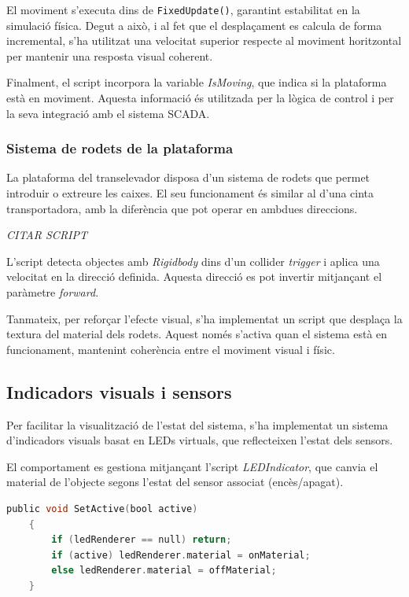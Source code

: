 \documentclass[12pt,a4paper]{report}
\begin{document}
El moviment s'executa dins de \texttt{FixedUpdate()}, garantint estabilitat en la simulació física. Degut a això, i al fet que el desplaçament es calcula de forma incremental, s'ha utilitzat una velocitat superior respecte al moviment horitzontal per mantenir una resposta visual coherent.

Finalment, el script incorpora la variable \textit{IsMoving}, que indica si la plataforma està en moviment. Aquesta informació és utilitzada per la lògica de control i per la seva integració amb el sistema SCADA.
\subsubsection{Sistema de rodets de la plataforma}

La plataforma del transelevador disposa d'un sistema de rodets que permet introduir o extreure les caixes. El seu funcionament és similar al d'una cinta transportadora, amb la diferència que pot operar en ambdues direccions.


\textit{CITAR SCRIPT}

L'script detecta objectes amb \textit{Rigidbody} \cite{UnityRigidbody} dins d'un collider \textit{trigger} i aplica una velocitat en la direcció definida. Aquesta direcció es pot invertir mitjançant el paràmetre \textit{forward}.

Tanmateix, per reforçar l'efecte visual, s'ha implementat un script que desplaça la textura del material dels rodets. Aquest només s'activa quan el sistema està en funcionament, mantenint coherència entre el moviment visual i físic.

\subsection{Indicadors visuals i sensors}

Per facilitar la visualització de l'estat del sistema, s'ha implementat un sistema d'indicadors visuals basat en LEDs virtuals, que reflecteixen l'estat dels sensors.

El comportament es gestiona mitjançant l'script \textit{LEDIndicator}, que canvia el material \cite{UnityMaterialsReference} de l'objecte segons l'estat del sensor associat (encès/apagat).

\begin{lstlisting}[language=C]
    public void SetActive(bool active)
    {
        if (ledRenderer == null) return;
        if (active) ledRenderer.material = onMaterial;
        else ledRenderer.material = offMaterial;
    }
\end{lstlisting}
\end{document}
